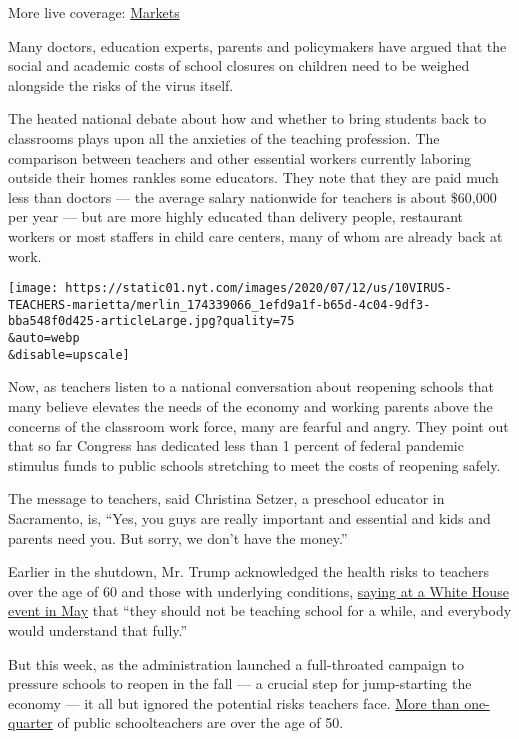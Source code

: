 More live coverage:
\href{https://www.nytimes.com/live/2020/08/04/business/stock-market-today-coronavirus?action=click\&pgtype=Article\&state=default\&region=MAIN_CONTENT_1\&context=storylines_live_updates}{Markets}

Many doctors, education experts, parents and policymakers have argued
that the social and academic costs of school closures on children need
to be weighed alongside the risks of the virus itself.

The heated national debate about how and whether to bring students back
to classrooms plays upon all the anxieties of the teaching profession.
The comparison between teachers and other essential workers currently
laboring outside their homes rankles some educators. They note that they
are paid much less than doctors --- the average salary nationwide for
teachers is about \$60,000 per year --- but are more highly educated
than delivery people, restaurant workers or most staffers in child care
centers, many of whom are already back at work.

\texttt{[image: https://static01.nyt.com/images/2020/07/12/us/10VIRUS-TEACHERS-marietta/merlin\_174339066\_1efd9a1f-b65d-4c04-9df3-bba548f0d425-articleLarge.jpg?quality=75\\\&auto=webp\\\&disable=upscale]}

Now, as teachers listen to a national conversation about reopening
schools that many believe elevates the needs of the economy and working
parents above the concerns of the classroom work force, many are fearful
and angry. They point out that so far Congress has dedicated less than 1
percent of federal pandemic stimulus funds to public schools stretching
to meet the costs of reopening safely.

The message to teachers, said Christina Setzer, a preschool educator in
Sacramento, is, ``Yes, you guys are really important and essential and
kids and parents need you. But sorry, we don't have the money.''

Earlier in the shutdown, Mr. Trump acknowledged the health risks to
teachers over the age of 60 and those with underlying conditions,
\href{https://www.whitehouse.gov/briefings-statements/remarks-president-trump-signing-proclamation-honor-national-nurses-day/}{saying
at a White House event in May} that ``they should not be teaching school
for a while, and everybody would understand that fully.''

But this week, as the administration launched a full-throated campaign
to pressure schools to reopen in the fall --- a crucial step for
jump-starting the economy --- it all but ignored the potential risks
teachers face. \href{https://nces.ed.gov/pubs2020/2020142.pdf}{More than
one-quarter} of public schoolteachers are over the age of 50.

